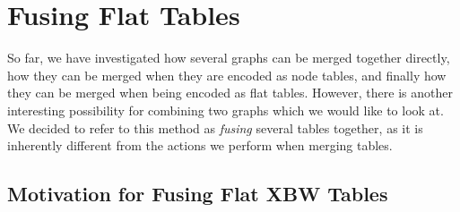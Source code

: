 \documentclass[a4paper,12pt,twoside,BCOR=10mm]{scrbook}
\begin{document}

\section{Fusing Flat Tables}
\label{sec:fusing_flat_tables}
%

So far, we have investigated how several graphs can be merged together directly,
how they can be merged when they are encoded as node tables,
and finally how they can be merged when being encoded as flat tables.
However, there is another interesting possibility for
combining two graphs which we would like to look at.
We decided to refer to this method as \textit{fusing} several tables together,
as it is inherently different from the actions we perform when merging tables.

\subsection{Motivation for Fusing Flat XBW Tables}
\end{document}
